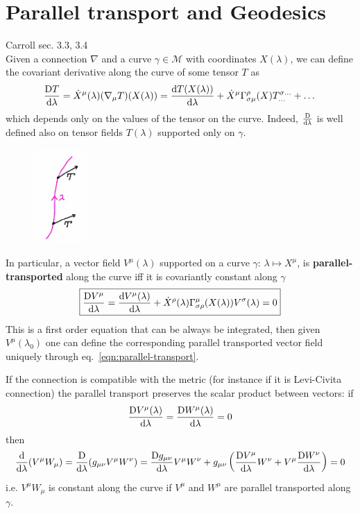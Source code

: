 \documentclass[../main/main.tex]{subfiles}
\begin{document}
\section{Parallel transport and Geodesics}
\textsf{Carroll sec. 3.3, 3.4}\\

Given a connection $\nabla$ and a curve $\gamma\in\mathcal M$ with coordinates $X(\lambda)$, we can define the covariant derivative along the curve of some tensor $T$ as
\[\frac{\text{D}T}{\textup{d}\lambda}=\dot X^\mu(\lambda)(\nabla_\mu T)(X(\lambda))=\frac{\textup{d} T(X(\lambda))}{\textup{d} \lambda}+\dot X^\mu{\Gamma}^{\rho}_{\sigma \mu}(X)T^{\sigma\dots}_{\dots}+\dots\]
which depends only on the values of the tensor on the curve. Indeed, $\frac{\text{D}}{\textup{d}\lambda}$ is well defined also on tensor fields $T(\lambda)$ supported only on $\gamma$.
\begin{figure}[H]
\centering
\includegraphics[width=2cm]{../img/parallel-transport.jpg}
\end{figure}
\noindent
In particular, a vector field $V^\mu(\lambda)$ supported on a curve $\gamma:\,\lambda\mapsto X^\mu$, is \textbf{parallel-transported} along the curve iff it is covariantly constant along $\gamma$
\begin{equation}\label{eqn:parallel-transport}\boxed{
\frac{\text{D}V^\mu}{\textup{d}\lambda}=\frac{\textup{d} V^\mu(\lambda)}{\textup{d}  \lambda}+\dot X^\rho(\lambda){\Gamma}^{\mu}_{\sigma \rho}(X(\lambda))V^\sigma(\lambda)=0
}\end{equation}
This is a first order equation that can be always be integrated, then given $V^\mu(\lambda_0)$ one can define the corresponding parallel transported vector field uniquely through eq.~\eqref{eqn:parallel-transport}. 

If the connection is compatible with the metric (for instance if it is Levi-Civita connection) the parallel transport preserves the scalar product between vectors: if
\[\frac{\text{D}V^\mu(\lambda)}{\textup{d}\lambda}=\frac{\text{D}W^\mu(\lambda)}{\textup{d}\lambda}=0\]
then
\[\frac{\textup{d} }{\textup{d} \lambda}(V^\mu W_\mu)=\frac{\text{D}}{\textup{d}\lambda}(g_{\mu\nu}V^\mu W^\nu)=\frac{\text{D}g_{\mu\nu}}{\textup{d}\lambda}V^\mu W^\nu+g_{\mu\nu}\left(\frac{\text{D}V^\mu}{\textup{d}\lambda}W^\nu+V^\mu\frac{\text{D}W^\nu}{\textup{d}\lambda}\right)=0\]
i.e. $V^\mu W_\mu$ is constant along the curve if $V^\mu$ and $W^\mu$ are parallel transported along $\gamma$. 
\end{document}
